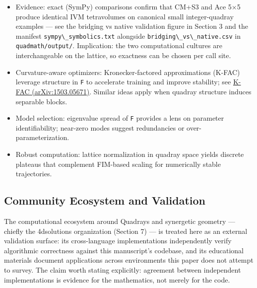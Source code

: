 \documentclass[
  10pt,
]{article}
\newcommand{\passthrough}[1]{#1}
\begin{document}
\begin{itemize}
\item
  Evidence: exact (SymPy) comparisons confirm that CM+S3 and Ace 5×5
  produce identical IVM tetravolumes on canonical small integer-quadray
  examples --- see the bridging vs native validation figure in Section 3
  and the manifest \passthrough{\lstinline!sympy\_symbolics.txt!}
  alongside \passthrough{\lstinline!bridging\_vs\_native.csv!} in
  \passthrough{\lstinline!quadmath/output/!}. Implication: the two
  computational cultures are interchangeable on the lattice, so
  exactness can be chosen per call site.
\item
  Curvature-aware optimizers: Kronecker-factored approximations (K-FAC)
  leverage structure in \passthrough{\lstinline!F!} to accelerate
  training and improve stability; see
  \href{https://arxiv.org/abs/1503.05671}{K-FAC (arXiv:1503.05671)}.
  Similar ideas apply when quadray structure induces separable blocks.
\item
  Model selection: eigenvalue spread of \passthrough{\lstinline!F!}
  provides a lens on parameter identifiability; near-zero modes suggest
  redundancies or over-parameterization.
\item
  Robust computation: lattice normalization in quadray space yields
  discrete plateaus that complement FIM-based scaling for numerically
  stable trajectories.
\end{itemize}

\subsection{Community Ecosystem and
Validation}\label{community-ecosystem-and-validation}

The computational ecosystem around Quadrays and synergetic geometry ---
chiefly the 4dsolutions organization (Section 7) --- is treated here as
an external validation surface: its cross-language implementations
independently verify algorithmic correctness against this manuscript's
codebase, and its educational materials document applications across
environments this paper does not attempt to survey. The claim worth
stating explicitly: agreement between independent implementations is
evidence for the mathematics, not merely for the code.
\end{document}
